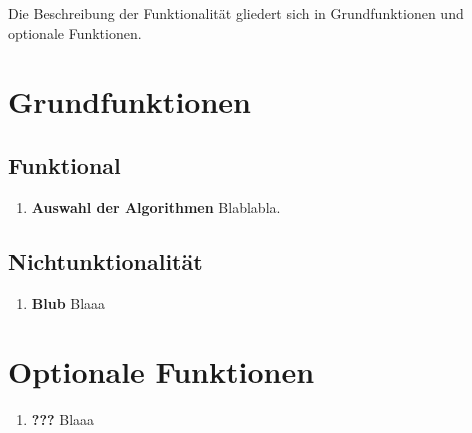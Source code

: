 
Die Beschreibung der Funktionalität gliedert sich in Grundfunktionen und optionale Funktionen.

\section{Grundfunktionen}
\subsection{Funktional}
\begin{enumerate}[ align=left, label={\textbf{\textbackslash F10\arabic*0\textbackslash}} ]
	\item \textbf{Auswahl der Algorithmen} 
	Blablabla.
\end{enumerate}	

\subsection{Nichtunktionalität}
\begin{enumerate}[ align=left, label={\textbf{\textbackslash F20\arabic*0\textbackslash}}]
	\item \textbf{Blub}
	Blaaa
\end{enumerate}

\section{Optionale Funktionen}
\begin{enumerate}[ align=left, label={\textbf{\textbackslash F30\arabic*0\textbackslash}}]
	\item \textbf{???}
	Blaaa
\end{enumerate}